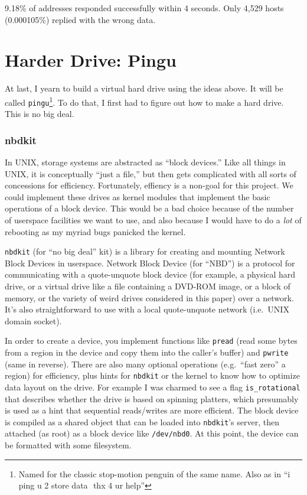 \documentclass[twocolumn]{article}
\begin{document}
9.18\% of addresses responded successfully within 4 seconds. Only
4,529 hosts (0.000105\%) replied with the wrong data.

\section{Harder Drive: Pingu} \label{sec:pingu}

At last, I yearn to build a virtual hard drive using the ideas above.
It will be called {\tt pingu}\footnote{Named for the classic
  stop-motion penguin of the same name. Also as in ``i ping u 2 store
  data\,\, thx 4 ur help''}. To do that, I first had to figure out how
to make a hard drive. This is no big deal.

\subsubsection{nbdkit} \label{sec:nbdkit}

In UNIX, storage systems are abstracted as ``block devices.'' Like all
things in UNIX, it is conceptually ``just a file,'' but then gets
complicated with all sorts of concessions for efficiency. Fortunately,
effiency is a non-goal for this project. We could implement these
drives as kernel modules that implement the basic operations of a
block device. This would be a bad choice because of the number of
userspace facilities we want to use, and also because I would have to
do a {\em lot} of rebooting as my myriad bugs panicked the kernel.

{\tt nbdkit} (for ``no big deal'' kit) is a library for creating and
mounting Network Block Devices in userspace. Network Block Device (for
``NBD'') is a protocol for communicating with a quote-unquote block
device (for example, a physical hard drive, or a virtual drive like a
file containing a DVD-ROM image, or a block of memory, or the variety
of weird drives considered in this paper) over a network. It's also
straightforward to use with a local quote-unquote network (i.e.~UNIX
domain socket).

In order to create a device, you implement functions like {\tt pread}
(read some bytes from a region in the device and copy them into the
caller's buffer) and {\tt pwrite} (same in reverse). There are also
many optional operations (e.g.~``fast zero'' a region) for efficiency,
plus hints for {\tt nbdkit} or the kernel to know how to optimize data
layout on the drive. For example I was charmed to see a flag
\verb+is_rotational+ that describes whether the drive is based on
spinning platters, which presumably is used as a hint that sequential
reads/writes are more efficient. The block device is compiled as a
shared object that can be loaded into {\tt nbdkit}'s server, then
attached (as root) as a block device like {\tt /dev/nbd0}. At this
point, the device can be formatted with some filesystem.
\end{document}
